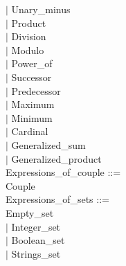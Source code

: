 \documentclass[12pt,a4paper,draft]{article}
\begin{document}
{\begin{sloppypar}
\hspace*{0.20in} $|$  Unary\_minus\\
\hspace*{0.20in} $|$  Product\\
\hspace*{0.20in} $|$  Division\\
\hspace*{0.20in} $|$  Modulo\\
\hspace*{0.20in} $|$  Power\_of\\
\hspace*{0.20in} $|$  Successor\\
\hspace*{0.20in} $|$  Predecessor\\
\hspace*{0.20in} $|$  Maximum\\
\hspace*{0.20in} $|$  Minimum\\
\hspace*{0.20in} $|$  Cardinal\\
\hspace*{0.20in} $|$  Generalized\_sum\\
\hspace*{0.20in} $|$  Generalized\_product\\
Expressions\_of\_couple ::= \\
\hspace*{0.20in}   Couple\\
Expressions\_of\_sets ::= \\
\hspace*{0.20in}   Empty\_set\\
\hspace*{0.20in} $|$  Integer\_set\\
\hspace*{0.20in} $|$  Boolean\_set\\
\hspace*{0.20in} $|$  Strings\_set\\



\end{sloppypar}}
\end{document}
